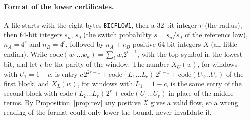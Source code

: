 \paragraph{Format of the lower certificates.} A file  starts with the eight bytes
\texttt{BICFLOW1}, then a 32-bit integer $r$ (the radius), then 64-bit integers $s_n$, $s_d$ (the switch
probability $s=s_n/s_d$ of the reference law), $n_A=4^r$ and $n_B=4^r$, followed by $n_A+n_B$ positive 64-bit
integers $X$ (all little-endian). Write $\mathrm{code}(w_1\ldots w_k)=\sum_i w_i2^{i-1}$, with the top symbol in the
lowest bit, and let $c$ be the parity of the window. The number $X_U(w)$, for windows with $U_1=1-c$, is entry
$c\,2^{2r-1}+\mathrm{code}(L_1\ldots L_r)\,2^{r-1}+\mathrm{code}(U_2\ldots U_r)$ of the first block, and $X_L(w)$, for
windows with $L_1=1-c$, is the same entry of the second block with $\mathrm{code}(L_2\ldots L_r)\,2^{r}+
\mathrm{code}(U_1\ldots U_r)$ in place of the middle terms. By Proposition~\ref{prop:rev} any positive $X$ gives a
valid flow, so a wrong reading of the format could only lower the bound, never invalidate it.

